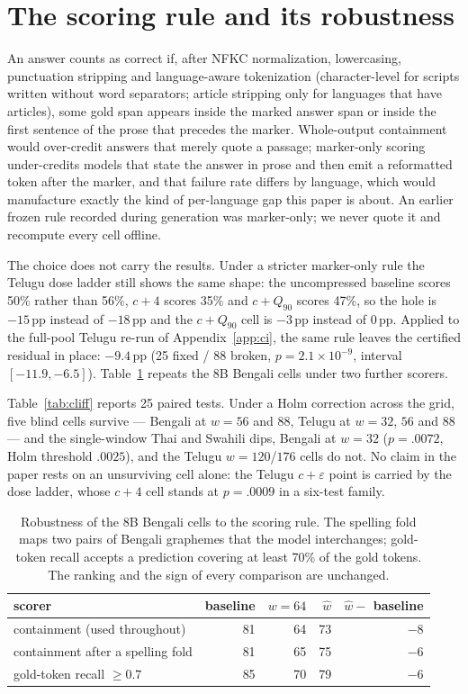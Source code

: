\documentclass{article}
\begin{document}
\section{The scoring rule and its robustness}
\label{app:r2}
An answer counts as correct if, after NFKC normalization, lowercasing,
punctuation stripping and language-aware tokenization (character-level
for scripts written without word separators; article stripping only for
languages that have articles), some gold span appears inside the marked
answer span or inside the first sentence of the prose that precedes the
marker. Whole-output containment would over-credit answers that merely
quote a passage; marker-only scoring under-credits models that state the
answer in prose and then emit a reformatted token after the marker, and
that failure rate differs by language, which would manufacture exactly
the kind of per-language gap this paper is about. An earlier frozen rule
recorded during generation was marker-only; we never quote it and
recompute every cell offline.

The choice does not carry the results. Under a stricter marker-only rule
the Telugu dose ladder still shows the same shape: the uncompressed
baseline scores 50\% rather than 56\%, $c{+}4$ scores 35\% and
$c{+}Q_{90}$ scores 47\%, so the hole is $-15$\,pp instead of $-18$\,pp
and the $c{+}Q_{90}$ cell is $-3$\,pp instead of $0$\,pp. Applied to the
full-pool Telugu re-run of Appendix~\ref{app:ci}, the same rule leaves
the certified residual in place: $-9.4$\,pp (25 fixed / 88 broken,
$p{=}2.1{\times}10^{-9}$, interval $[-11.9,-6.5]$). Table~\ref{tab:8brobust}
repeats the 8B Bengali cells under two further scorers.

Table~\ref{tab:cliff} reports 25 paired tests. Under a Holm correction
across the grid, five blind cells survive --- Bengali at $w{=}56$ and
$88$, Telugu at $w{=}32$, $56$ and $88$ --- and the single-window Thai
and Swahili dips, Bengali at $w{=}32$ ($p{=}.0072$, Holm threshold
$.0025$), and the Telugu $w{=}120$/$176$ cells do not. No claim in the
paper rests on an unsurviving cell alone: the Telugu $c{+}\varepsilon$
point is carried by the dose ladder, whose $c{+}4$ cell stands at
$p{=}.0009$ in a six-test family.

\begin{table}[h]
\caption{Robustness of the 8B Bengali cells to the scoring rule. The
spelling fold maps two pairs of Bengali graphemes that the model
interchanges; gold-token recall accepts a prediction covering at least
70\% of the gold tokens. The ranking and the sign of every comparison are
unchanged.}
\label{tab:8brobust}
\centering
\small
\begin{tabular}{lrrrr}
\toprule
scorer & baseline & $w{=}64$ & $\hat w$ & $\hat w -$ baseline \\
\midrule
containment (used throughout) & 81 & 64 & 73 & ${-}8$ \\
containment after a spelling fold & 81 & 65 & 75 & ${-}6$ \\
gold-token recall $\ge 0.7$ & 85 & 70 & 79 & ${-}6$ \\
\bottomrule
\end{tabular}
\end{table}
\end{document}
